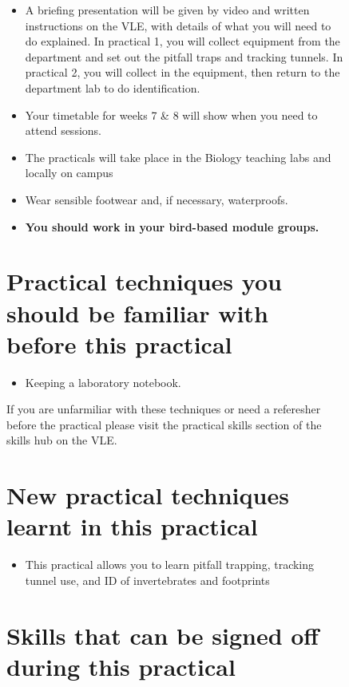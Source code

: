 \documentclass[
  letterpaper,
  DIV=11,
  numbers=noendperiod]{scrreprt}
\providecommand{\tightlist}{%
  \setlength{\itemsep}{0pt}\setlength{\parskip}{0pt}}
\begin{document}
\begin{figure}
{\begin{itemize}
\tightlist
\item
  A briefing presentation will be given by video and written
  instructions on the VLE, with details of what you will need to do
  explained. In practical 1, you will collect equipment from the
  department and set out the pitfall traps and tracking tunnels. In
  practical 2, you will collect in the equipment, then return to the
  department lab to do identification.
\item
  Your timetable for weeks 7 \& 8 will show when you need to attend
  sessions.
\item
  The practicals will take place in the Biology teaching labs and
  locally on campus
\item
  Wear sensible footwear and, if necessary, waterproofs.
\item
  \textbf{You should work in your bird-based module groups.}
\end{itemize}

\section{Practical techniques you should be familiar with before this
practical}\label{practical-techniques-you-should-be-familiar-with-before-this-practical-1}

\begin{itemize}
\tightlist
\item
  Keeping a laboratory notebook.
\end{itemize}

If you are unfarmiliar with these techniques or need a referesher before
the practical please visit the practical skills section of the skills
hub on the VLE.

\section{New practical techniques learnt in this
practical}\label{new-practical-techniques-learnt-in-this-practical-1}

\begin{itemize}
\tightlist
\item
  This practical allows you to learn pitfall trapping, tracking tunnel
  use, and ID of invertebrates and footprints
\end{itemize}

\section{Skills that can be signed off during this
practical}\label{skills-that-can-be-signed-off-during-this-practical-1}

}
\end{figure}
\end{document}
